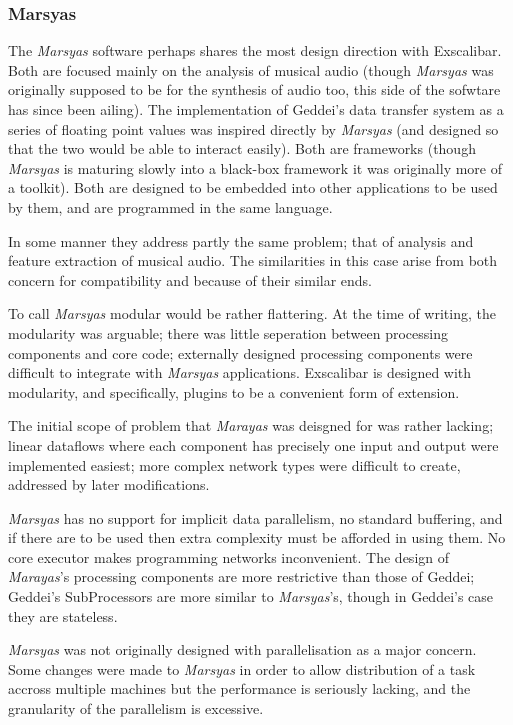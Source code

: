 \subsubsection{Marsyas}

The \textit{Marsyas} software perhaps shares the most design direction with Exscalibar. Both are focused mainly on the analysis of musical audio (though \textit{Marsyas} was originally supposed to be for the synthesis of audio too, this side of the sofwtare has since been ailing). The implementation of Geddei's data transfer system as a series of floating point values was inspired directly by \textit{Marsyas} (and designed so that the two would be able to interact easily). Both are frameworks (though \textit{Marsyas} is maturing slowly into a black-box framework it was originally more of a toolkit). Both are designed to be embedded into other applications to be used by them, and are programmed in the same language.

In some manner they address partly the same problem; that of analysis and feature extraction of musical audio. The similarities in this case arise from both concern for compatibility and because of their similar ends.

To call \textit{Marsyas} modular would be rather flattering. At the time of writing, the modularity was arguable; there was little seperation between processing components and core code; externally designed processing components were difficult to integrate with \textit{Marsyas} applications. Exscalibar is designed with modularity, and specifically, plugins to be a convenient form of extension.

The initial scope of problem that \textit{Marayas} was deisgned for was rather lacking; linear dataflows where each component has precisely one input and output were implemented easiest; more complex network types were difficult to create, addressed by later modifications.

\textit{Marsyas} has no support for implicit data parallelism, no standard buffering, and if there are to be used then extra complexity must be afforded in using them. No core executor makes programming networks inconvenient. The design of \textit{Marayas}'s processing components are more restrictive than those of Geddei; Geddei's SubProcessors are more similar to \textit{Marsyas}'s, though in Geddei's case they are stateless.

\textit{Marsyas} was not originally designed with parallelisation as a major concern. Some changes were made to \textit{Marsyas} in order to allow distribution of a task accross multiple machines but the performance is seriously lacking, and the granularity of the parallelism is excessive. 

